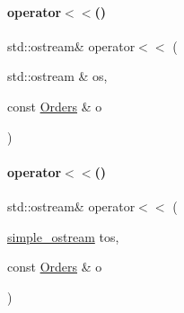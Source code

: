 \mbox{\label{_builds_8cpp_a5fb6be27fb40218ba8338cb8727178cd}} 
\paragraph{\texorpdfstring{operator$<$$<$()}{operator<<()}\hspace{0.1cm}{\footnotesize\ttfamily [2/3]}}
{\footnotesize\ttfamily std\+::ostream\& operator$<$$<$ (\begin{DoxyParamCaption}\item[{std\+::ostream \&}]{os,  }\item[{const \mbox{\hyperlink{class_orders}{Orders}} \&}]{o }\end{DoxyParamCaption})}

\mbox{\label{_builds_8cpp_a6125e4e6c603847e74d5f5ccb05da74e}} 
\paragraph{\texorpdfstring{operator$<$$<$()}{operator<<()}\hspace{0.1cm}{\footnotesize\ttfamily [3/3]}}
{\footnotesize\ttfamily std\+::ostream\& operator$<$$<$ (\begin{DoxyParamCaption}\item[{\mbox{\hyperlink{structsimple__ostream}{simple\+\_\+ostream}}}]{tos,  }\item[{const \mbox{\hyperlink{class_orders}{Orders}} \&}]{o }\end{DoxyParamCaption})}

